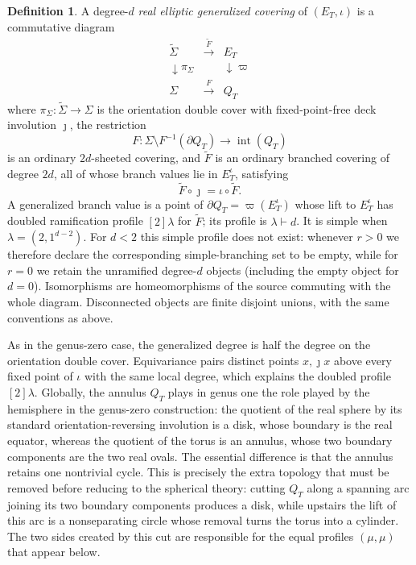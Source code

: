 \documentclass[11pt,a4paper,reqno]{article}
\theoremstyle{definition}
\newtheorem{definition}[theorem]{Definition}
\theoremstyle{remark}
\begin{document}
\begin{definition}\label{def:real-elliptic-cover}
A degree-$d$ \emph{real elliptic generalized covering} of $(E_T,\iota)$ is a commutative diagram
\begin{equation}\label{eq:real-elliptic-cover-diagram}
\begin{array}{ccc}
\widetilde\Sigma&\xrightarrow{\ \widetilde F\ }&E_T\\
\downarrow\pi_\Sigma&&\downarrow \varpi\\
\Sigma&\xrightarrow{\ F\ }&Q_T
\end{array}
\end{equation}
where $\pi_\Sigma:\widetilde\Sigma\to\Sigma$ is the orientation double cover with fixed-point-free deck involution $\jmath$, the restriction
\[
F:\Sigma\setminus F^{-1}(\partial Q_T)\longrightarrow\operatorname{int}(Q_T)
\]
is an ordinary $2d$-sheeted covering, and $\widetilde F$ is an ordinary branched covering of degree $2d$, all of whose branch values lie in $E_T^\iota$, satisfying
\begin{equation}\label{eq:real-equivariance}
\widetilde F\circ\jmath=\iota\circ\widetilde F.
\end{equation}
A generalized branch value is a point of $\partial Q_T=\varpi(E_T^\iota)$ whose lift to $E_T^\iota$ has doubled ramification profile $[2]\lambda$ for $\widetilde F$; its profile is $\lambda\vdash d$.  It is simple when $\lambda=(2,1^{d-2})$.  For $d<2$ this simple profile does not exist: whenever $r>0$ we therefore declare the corresponding simple-branching set to be empty, while for $r=0$ we retain the unramified degree-$d$ objects (including the empty object for $d=0$).  Isomorphisms are homeomorphisms of the source commuting with the whole diagram.  Disconnected objects are finite disjoint unions, with the same conventions as above.
\end{definition}

As in the genus-zero case, the generalized degree is half the degree on the orientation double cover.  Equivariance pairs distinct points $x,\jmath x$ above every fixed point of $\iota$ with the same local degree, which explains the doubled profile $[2]\lambda$. Globally, the annulus $Q_T$ plays in genus one the role played by the hemisphere in the genus-zero construction: the quotient of the real sphere by its standard orientation-reversing involution is a disk, whose boundary is the real equator, whereas the quotient of the torus is an annulus, whose two boundary components are the two real ovals. The essential difference is that the annulus retains one nontrivial cycle.  This is precisely the extra topology that must be removed before reducing to the spherical theory: cutting $Q_T$ along a spanning arc joining its two boundary components produces a disk, while upstairs the lift of this arc is a nonseparating circle whose removal turns the torus into a cylinder.  The two sides created by this cut are responsible for the equal profiles $(\mu,\mu)$ that appear below.
\end{document}
